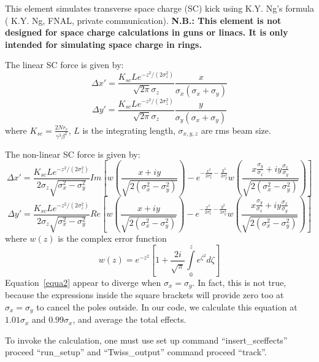 

This element simulates transverse space charge (SC) kick using
K.Y. Ng's formula ( K.Y. Ng, FNAL, private communication). 
{\bf N.B.: This element is not designed for space charge
calculations in guns or linacs.  It is only intended for
simulating space charge in rings. }

The linear SC force is given by:
\[
\Delta x'=\frac{K_{sc}Le^{-z^2/(2\sigma_z^2)}}{\sqrt{2\pi}\sigma_z}
\frac{x}{\sigma_x(\sigma_x+\sigma_y)}
\]
\begin{equation}
\Delta y'=\frac{K_{sc}Le^{-z^2/(2\sigma_z^2)}}{\sqrt{2\pi}\sigma_z}
\frac{y}{\sigma_y(\sigma_x+\sigma_y)}
\end{equation}
where $K_{sc}=\frac{2Nr_e}{\gamma^3\beta^2}$,
$L$ is the integrating length, $\sigma_{x,y,z}$ are rms beam size.

The non-linear SC force is given by:
\[
\Delta x'=\frac{K_{sc}Le^{-z^2/(2\sigma_z^2)}}{2\sigma_z\sqrt{\sigma_x^2-\sigma_y^2}}
Im\left [ w\left( \frac{x+iy}{\sqrt{2(\sigma_x^2-\sigma_y^2)}} \right)
-e^{-\frac{x^2}{2 \sigma_x^2}-\frac{y^2}{2 \sigma_y^2}}
w\left(\frac{x\frac{\sigma_y}{\sigma_x}+iy\frac{\sigma_x}{\sigma_y}}
{\sqrt{2(\sigma_x^2-\sigma_y^2)}}\right)\right ]
\]
\begin{equation}
\Delta y'=\frac{K_{sc}Le^{-z^2/(2\sigma_z^2)}}{2\sigma_z\sqrt{\sigma_x^2-\sigma_y^2}}
Re\left [ w\left( \frac{x+iy}{\sqrt{2(\sigma_x^2-\sigma_y^2)}} \right)
-e^{-\frac{x^2}{2 \sigma_x^2}-\frac{y^2}{2 \sigma_y^2}}
w\left(\frac{x\frac{\sigma_y}{\sigma_x}+iy\frac{\sigma_x}{\sigma_y}}
{\sqrt{2(\sigma_x^2-\sigma_y^2)}}\right)\right ]
\label{equa2}
\end{equation}
where $w(z)$ is the complex error function
\begin{equation}
w(z)=e^{-z^2}\left [ 1+\frac{2i}{\sqrt{\pi}}\int\limits_0^z e^{\zeta^2}d\zeta\right ]
\end{equation}
Equation~\ref{equa2} appear to diverge when $\sigma_x=\sigma_y$. In fact, this is not
true, because the expressions inside the square brackets will provide zero too at
$\sigma_x=\sigma_y$ to cancel the poles outside. In our code, we calculate this equation
at  $1.01 \sigma_x$ and $0.99\sigma_x$, and average the total effects. 
 
To invoke the calculation, one must use set up command
``insert\_sceffects'' proceed ``run\_setup'' and ``Twiss\_output''
command proceed ``track''.

